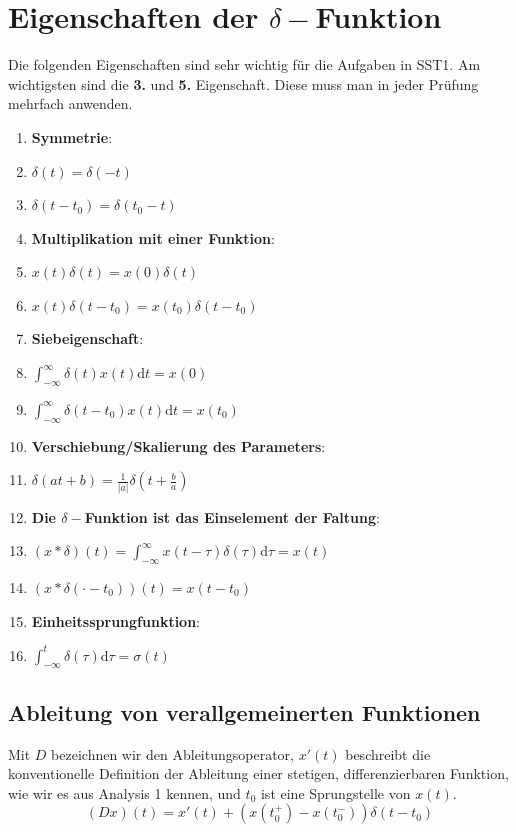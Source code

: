 \documentclass[11pt]{article}
\begin{document}
\section*{Eigenschaften der $\delta-$Funktion}
\vspace*{-0.5cm}
Die folgenden Eigenschaften sind sehr wichtig für die Aufgaben in SST1. Am wichtigsten sind die \textbf{3.} und \textbf{5.} Eigenschaft. Diese muss man in jeder Prüfung mehrfach anwenden.
\vspace*{-0.5cm}
\begin{enumerate}
    \item \textbf{Symmetrie}: 
    \item[] $\delta(t) = \delta(-t)$
    \item[] $\delta(t-t_0) = \delta(t_0 - t)$
    \item \textbf{Multiplikation mit einer Funktion}: \item[] $x(t)\delta(t) = x(0)\delta(t)$
    \item[] $x(t)\delta(t-t_0)=x(t_0)\delta(t-t_0)$
    \item \textbf{Siebeigenschaft}: 
    \item[] $\displaystyle\int_{-\infty}^{\infty}\delta(t)x(t)\text{d}t = x(0)$
    \item[] $\displaystyle\int_{-\infty}^{\infty}\delta(t-t_0)x(t)\text{d}t = x(t_0)$
    \item \textbf{Verschiebung/Skalierung des Parameters}:
    \item[] $\delta(at + b) = \displaystyle\frac{1}{|a|}\delta\left(t + \displaystyle\frac{b}{a} \right)$
    \item \textbf{Die $\delta-$Funktion ist das Einselement der Faltung}:
    \item[] $(x \ast \delta)(t) = \displaystyle\int_{-\infty}^\infty x(t-\tau)\delta(\tau)\text{d}\tau = x(t)$
    \item[] $(x \ast \delta(\cdot - t_0))(t) = x(t - t_0)$
    \item \textbf{Einheitssprungfunktion}:
    \item[] $\displaystyle\int_{-\infty}^t \delta(\tau) \text{d}\tau = \sigma(t)$
\end{enumerate}

\vspace*{-0.5cm}
\subsection*{Ableitung von verallgemeinerten Funktionen}
\vspace*{-0.5cm}
Mit $D$ bezeichnen wir den Ableitungsoperator, $x'(t)$ beschreibt die konventionelle Definition der Ableitung einer stetigen, differenzierbaren Funktion, wie wir es aus Analysis 1 kennen, und $t_0$ ist eine Sprungstelle von $x(t)$.
$$(Dx)(t) = x'(t) + (x(t_0^+)- x(t_0^-))\delta(t-t_0)$$
\end{document}
